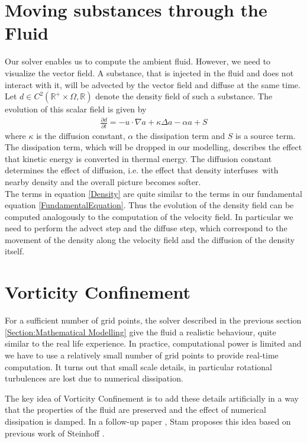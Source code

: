 \documentclass[a4paper,10pt,oneside,final,german,openbib,pdftex,titlepage]{scrbook}
\begin{document}
\section{Moving substances through the Fluid}
Our solver enables us to compute the ambient fluid. However, we need to visualize the vector field. A substance, that is injected in the fluid and does not interact with it, will be advected by the vector field and diffuse at the same time. Let $d \in C^2(\mathbb{R}^+\times\Omega, \mathbb{R})$ denote the density field of such a substance. The evolution of this scalar field is given by
\begin{align}
	\frac{\partial d}{\partial t} = - u \cdot \nabla a + \kappa \Delta a - \alpha  a + S \label{Density}
\end{align}
where $\kappa$ is the diffusion constant, $\alpha$ the dissipation term and $S$ is a source term. The dissipation term, which will be dropped in our modelling, describes the effect that kinetic energy is converted in thermal energy. The diffusion constant determines the effect of diffusion, i.e. the effect that density \grqq interfuses\grqq ~with nearby density and the overall picture becomes \grqq  softer\grqq .\\

The terms in equation \ref{Density} are quite similar to the terms in our fundamental equation \ref{FundamentalEquation}. Thus the evolution of the density field can be computed analogously to the computation of the velocity field. In particular we need to perform the advect step and the diffuse step, which correspond to the movement of the density along the velocity field and the diffusion of the density itself.

\section{Vorticity Confinement}
For a sufficient number of grid points, the solver described in the previous section \ref{Section:Mathematical Modelling} give the fluid a realistic behaviour, quite similar to the real life experience. In practice, computational power is limited and we have to use a relatively small number of grid points to provide real-time computation. It turns out that small scale details, in particular rotational turbulences are lost due to numerical dissipation.

The key idea of Vorticity Confinement is to add these details artificially in a way that the properties of the fluid are preserved and the effect of numerical dissipation is damped. In a follow-up paper \cite{Stam2}, Stam proposes this idea based on previous work of Steinhoff \cite{Steinhoff}.\\
\end{document}
